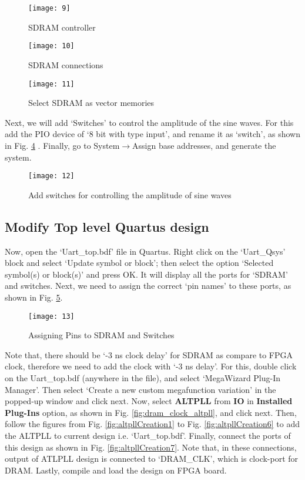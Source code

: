 \begin{figure}[!h]
	\centering
	\texttt{[image: 9]}
	\caption{SDRAM controller}
	\label{fig:sdram_con}
\end{figure}


\begin{figure}[!h]
	\centering
	\texttt{[image: 10]}
	\caption{SDRAM connections}
	\label{fig:sdram_connections}
\end{figure}


\begin{figure}[!h]
	\centering
	\texttt{[image: 11]}
	\caption{Select SDRAM as vector memories}
	\label{fig:sdram_vector_memory}
\end{figure}


Next, we will add `Switches' to control the amplitude of the sine waves. For this add the PIO device of `8 bit with type input', and rename it as `switch', as shown in Fig. \ref{fig:switchForAmplitude} . Finally, go to System$\rightarrow$Assign base addresses, and generate the system. 

\begin{figure}[!h]
	\centering
	\texttt{[image: 12]}
	\caption{Add switches for controlling the amplitude of sine waves}
	\label{fig:switchForAmplitude}
\end{figure}


\subsection{Modify Top level Quartus design}
Now, open the `Uart\_top.bdf' file in Quartus. Right click on the `Uart\_Qsys' block and select `Update symbol or block'; then select the option `Selected symbol(s) or block(s)' and press OK. It will display all the ports for `SDRAM' and switches. Next, we need to assign the correct `pin names' to these ports, as shown in Fig. \ref{fig:SDRAM_Pinassg}.  

\begin{figure}[!h]
	\centering
	\texttt{[image: 13]}
	\caption{Assigning Pins to SDRAM and Switches}
	\label{fig:SDRAM_Pinassg}
\end{figure}

Note that, there should be `-3 ns clock delay' for SDRAM as compare to FPGA clock, therefore we need to add the clock with `-3 ns delay'. For this, double click on the Uart\_top.bdf (anywhere in the file), and select `MegaWizard Plug-In Manager'. Then select `Create a new custom megafunction variation' in the popped-up window and click next. Now, select \textbf{ALTPLL} from \textbf{IO} in \textbf{Installed Plug-Ins} option, as shown in Fig. \ref{fig:dram_clock_altpll}, and click next. Then, follow the figures from Fig. \ref{fig:altpllCreation1} to Fig. \ref{fig:altpllCreation6} to add the ALTPLL to current design i.e. `Uart\_top.bdf'. Finally, connect the ports of this design as shown in Fig. \ref{fig:altpllCreation7}. Note that, in these connections, output of ATLPLL design is connected to `DRAM\_CLK', which is clock-port for DRAM. Lastly, compile and load the design on FPGA board. 

